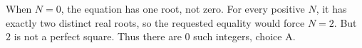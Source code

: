 When $N=0$, the equation has one root, not zero. For every positive $N$, it has exactly two distinct real roots, so the requested equality would force $N=2$. But $2$ is not a perfect square. Thus there are $\boxed0$ such integers, choice A.
